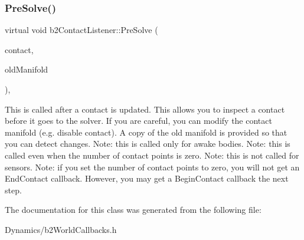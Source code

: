 \subsubsection{\texorpdfstring{Pre\+Solve()}{PreSolve()}}
{\footnotesize\ttfamily virtual void b2\+Contact\+Listener\+::\+Pre\+Solve (\begin{DoxyParamCaption}\item[{\mbox{\hyperlink{classb2Contact}{b2\+Contact}} $\ast$}]{contact,  }\item[{const \mbox{\hyperlink{structb2Manifold}{b2\+Manifold}} $\ast$}]{old\+Manifold }\end{DoxyParamCaption})\hspace{0.3cm}{\ttfamily [inline]}, {\ttfamily [virtual]}}

This is called after a contact is updated. This allows you to inspect a contact before it goes to the solver. If you are careful, you can modify the contact manifold (e.\+g. disable contact). A copy of the old manifold is provided so that you can detect changes. Note\+: this is called only for awake bodies. Note\+: this is called even when the number of contact points is zero. Note\+: this is not called for sensors. Note\+: if you set the number of contact points to zero, you will not get an End\+Contact callback. However, you may get a Begin\+Contact callback the next step. 

The documentation for this class was generated from the following file\+:\begin{DoxyCompactItemize}
\item 
Dynamics/b2\+World\+Callbacks.\+h\end{DoxyCompactItemize}
